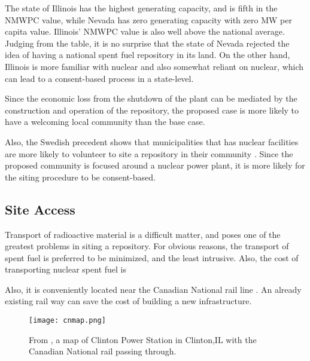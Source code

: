 	
The state of Illinois has the highest generating capacity, and is fifth in the \gls{NMWPC}
 value, while Nevada has zero generating capacity with zero MW per capita value. 
Illinois' \gls{NMWPC} value is also well above the national average. Judging from the
table, it is no surprise that the state of Nevada rejected the idea of having a national
spent fuel repository in its land. On the other hand, Illinois is more familiar with 
nuclear and also somewhat reliant on nuclear, which can lead to a consent-based process
in a state-level. 

Since the economic loss from the shutdown of the plant can be mediated by the 
construction and operation of the repository, the proposed case is more likely
to have a welcoming local community than the base case.

Also, the Swedish precedent shows that municipalities that has nuclear facilities
are more likely to volunteer to site a repository in their community
 \cite{Olsson_2013}. Since the proposed community is focused around a nuclear
 power plant, it is more likely for the siting procedure to be consent-based.
 
 

	 
\subsection{Site Access}




Transport of radioactive material is a difficult matter, and poses one of the greatest
problems in siting a repository. For obvious reasons, the transport of spent fuel
is preferred to be minimized, and the least intrusive. Also, the cost of transporting
nuclear spent fuel is 

Also, it is conveniently located near the Canadian National rail line \cite{waleed_regional_2015}. An already existing rail way can
save the cost of building a new infrastructure.

\begin{figure}[!h] 
  \centering
  \texttt{[image: cnmap.png]}	
        \caption{From \cite{CN-national}, a map of Clinton Power Station in Clinton,IL
        with the Canadian National rail passing through.}
  \label{fig:cnmap.png}
\end{figure}

